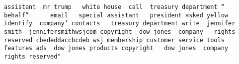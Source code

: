 \documentclass[
]{article}
\begin{document}
\begin{verbatim}
assistant  mr trump   white house  call  treasury department “  behalf”      email   special assistant   president asked yellow  identify  company’ contacts   treasury department write  jennifer smith  jennifersmithwsjcom copyright  dow jones  company   rights reserved cbededdaccbcdeb wsj membership customer service tools  features ads  dow jones products copyright   dow jones  company   rights reserved"                                                                                                                                                                                                                                                                                                                                                                                                                                                                                                                                                                                                                                                                                                                                                                                                                                                                                                                                                                                                                                                                                                                                                                                                                                                                                                                                                                                                                                                                                                                                                                                                                                                                                                                                                                                                                                                                                                                                                                                                                                                                                                                                                                                                                                                                                                                                                                                                                                                                                                                                                                                                                                                                                                                                                                                                                                                                                                                                                                                                                                
\end{verbatim}
\end{document}
